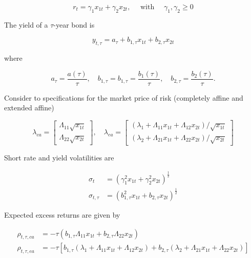 $$
r_{t}=\gamma_{1} x_{1 t}+\gamma_{2} x_{2 t}, \quad \text { with } \quad \gamma_{1}, \gamma_{2} \geq 0
$$

The yield of a $\tau$-year bond is

$$
y_{t, \tau}=a_{\tau}+b_{1, \tau} x_{1 t}+b_{2, \tau} x_{2 t}
$$

where

$$
a_{\tau}=\frac{a(\tau)}{\tau}, \quad b_{1, \tau}=b_{1, \tau}=\frac{b_{1}(\tau)}{\tau}, \quad b_{2, \tau}=\frac{b_{2}(\tau)}{\tau} .
$$

Consider to specifications for the market price of risk (completely affine and extended affine)

$$
\lambda_{c a}=\left[\begin{array}{l}
\Lambda_{11} \sqrt{x_{1 t}} \\
\Lambda_{22} \sqrt{x_{2 t}}
\end{array}\right], \quad \lambda_{e a}=\left[\begin{array}{l}
\left(\lambda_{1}+\Lambda_{11} x_{1 t}+\Lambda_{12} x_{2 t}\right) / \sqrt{x_{1 t}} \\
\left(\lambda_{2}+\Lambda_{21} x_{1 t}+\Lambda_{22} x_{2 t}\right) / \sqrt{x_{2 t}}
\end{array}\right]
$$

Short rate and yield volatilities are

$$
\begin{aligned}
\sigma_{t} & =\left(\gamma_{1}^{2} x_{1 t}+\gamma_{2}^{2} x_{2 t}\right)^{\frac{1}{2}} \\
\sigma_{t, \tau} & =\left(b_{1, \tau}^{2} x_{1 t}+b_{2, \tau} x_{2 t}\right)^{\frac{1}{2}}
\end{aligned}
$$

Expected excess returns are given by

$$
\begin{aligned}
\rho_{t, \tau, c a} & =-\tau\left(b_{1, \tau} \Lambda_{11} x_{1 t}+b_{2, \tau} \Lambda_{22} x_{2 t}\right) \\
\rho_{t, \tau, e a} & =-\tau\left[b_{1, \tau}\left(\lambda_{1}+\Lambda_{11} x_{1 t}+\Lambda_{12} x_{2 t}\right)+b_{2, \tau}\left(\lambda_{2}+\Lambda_{21} x_{1 t}+\Lambda_{22} x_{2 t}\right)\right]
\end{aligned}
$$

